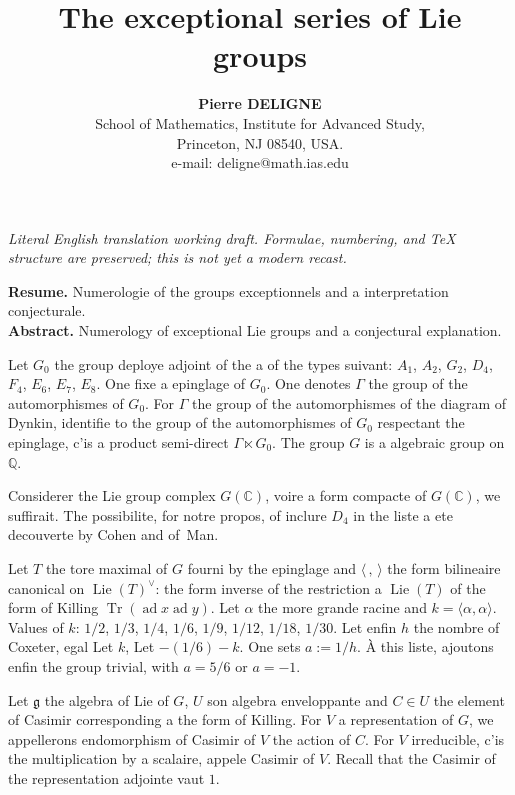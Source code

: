 \documentclass[11pt,a4paper]{article}
\title{The exceptional series of Lie groups}
\author{\textbf{Pierre DELIGNE}\\[2pt]
\small School of Mathematics, Institute for Advanced Study,\\
\small Princeton, NJ 08540, USA.\\
\small e-mail: deligne@math.ias.edu}
\date{}
\DeclareMathOperator{\Tr}{Tr}
\DeclareMathOperator{\Lie}{Lie}
\DeclareMathOperator{\ad}{ad}
\newcommand{\frg}{\mathfrak{g}}
\newcommand{\C}{\mathbb{C}}
\newcommand{\Q}{\mathbb{Q}}
\begin{document}
\begin{center}\small\emph{Literal English translation working draft. Formulae, numbering, and TeX structure are preserved; this is not yet a modern recast.}\end{center}
\vspace{0.5em}

\maketitle

\noindent\textbf{Resume.} Numerologie of the groups exceptionnels and a interpretation conjecturale.\\[2pt]
\textbf{Abstract.} Numerology of exceptional Lie groups and a conjectural explanation.

\bigskip

Let $G_0$ the group deploye adjoint of the a of the types suivant: $A_1$, $A_2$, $G_2$, $D_4$, $F_4$, $E_6$, $E_7$, $E_8$.
One fixe a epinglage of $G_0$. One denotes $\Gamma$ the group of the automorphismes of $G_0$. For $\Gamma$ the group of the automorphismes of the diagram of Dynkin, identifie to the group of the automorphismes of $G_0$ respectant the epinglage, c'is a product semi-direct $\Gamma \ltimes G_0$. The group $G$ is a algebraic group on $\Q$.

Considerer the Lie group complex $G(\C)$, voire a form compacte of $G(\C)$, we suffirait. The possibilite, for notre propos, of inclure $D_4$ in the liste a ete decouverte by Cohen and of~Man.

Let $T$ the tore maximal of $G$ fourni by the epinglage and $\langle \, , \, \rangle$ the form bilineaire canonical on $\Lie(T)^\vee$: the form inverse of the restriction a $\Lie(T)$ of the form of Killing $\Tr(\ad x \ad y)$. Let $\alpha$ the more grande racine and $k = \langle \alpha, \alpha \rangle$. Values of $k$: $1/2$, $1/3$, $1/4$, $1/6$, $1/9$, $1/12$, $1/18$, $1/30$. Let enfin $h$ the nombre of Coxeter, egal Let $k$, Let $-(1/6) - k$. One sets $a := 1/h$. \`A this liste, ajoutons enfin the group trivial, with $a = 5/6$ or $a = -1$.

Let $\frg$ the algebra of Lie of $G$, $U$ son algebra enveloppante and $C \in U$ the element of Casimir corresponding a the form of Killing. For $V$ a representation of $G$, we appellerons endomorphism of Casimir of $V$ the action of $C$. For $V$ irreducible, c'is the multiplication by a scalaire, appele Casimir of $V$. Recall that the Casimir of the representation adjointe vaut $1$.
\end{document}
